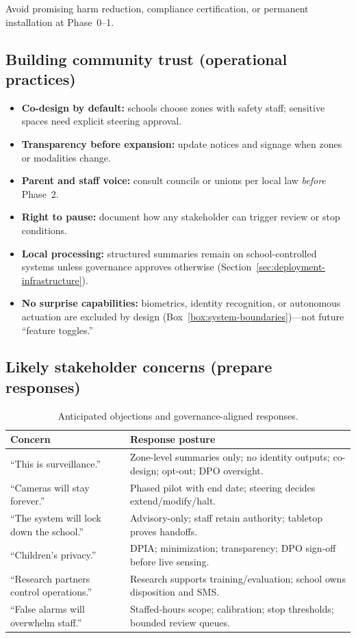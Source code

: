 Avoid promising harm reduction, compliance certification, or permanent installation at Phase~0--1.

\subsection{Building community trust (operational practices)}

\begin{itemize}[noitemsep]
  \item \textbf{Co-design by default:} schools choose zones with safety staff; sensitive spaces need
        explicit steering approval.
  \item \textbf{Transparency before expansion:} update notices and signage when zones or modalities change.
  \item \textbf{Parent and staff voice:} consult councils or unions per local law \emph{before} Phase~2.
  \item \textbf{Right to pause:} document how any stakeholder can trigger review or stop conditions.
  \item \textbf{Local processing:} structured summaries remain on school-controlled systems unless
        governance approves otherwise (Section~\ref{sec:deployment-infrastructure}).
  \item \textbf{No surprise capabilities:} biometrics, identity recognition, or autonomous actuation
        are excluded by design (Box~\ref{box:system-boundaries})---not future ``feature toggles.''
\end{itemize}

\subsection{Likely stakeholder concerns (prepare responses)}

\begin{table}[htbp]
  \centering
  \caption{Anticipated objections and governance-aligned responses.}
  \label{tab:stakeholder-objections}
  \small
  \begin{tabular}{@{}p{3.2cm}p{5.8cm}@{}}
    \toprule
    Concern & Response posture \\
    \midrule
    ``This is surveillance.'' &
      Zone-level summaries only; no identity outputs; co-design; opt-out; DPO oversight. \\
    ``Cameras will stay forever.'' &
      Phased pilot with end date; steering decides extend/modify/halt. \\
    ``The system will lock down the school.'' &
      Advisory-only; staff retain authority; tabletop proves handoffs. \\
    ``Children's privacy.'' &
      DPIA; minimization; transparency; DPO sign-off before live sensing. \\
    ``Research partners control operations.'' &
      Research supports training/evaluation; school owns disposition and SMS. \\
    ``False alarms will overwhelm staff.'' &
      Staffed-hours scope; calibration; stop thresholds; bounded review queues. \\
    \bottomrule
  \end{tabular}
\end{table}

